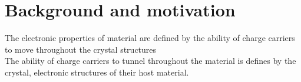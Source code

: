 \section{Background and motivation}

    The electronic properties of material are defined by the ability of charge carriers to move throughout the crystal structures \cite{Novoselov2005}
    \\

    
    The ability of charge carriers to tunnel throughout the material is defines by the crystal, electronic structures of their host material.


